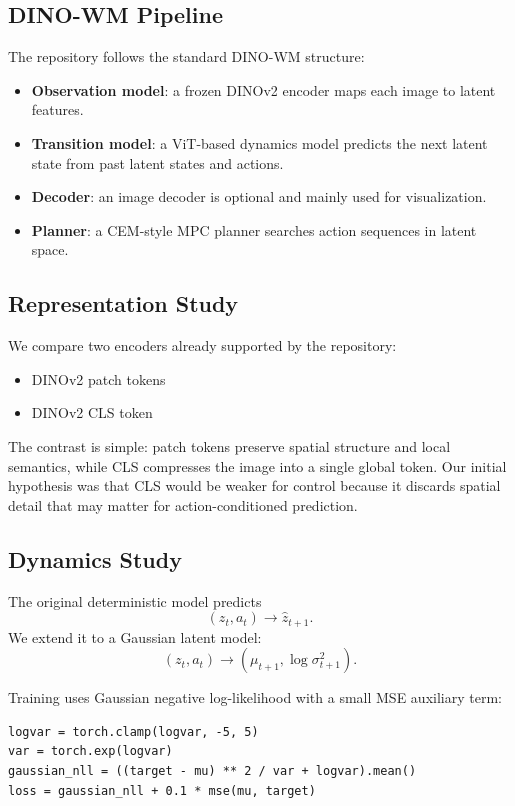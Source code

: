 \documentclass[11pt]{article}
\begin{document}
\subsection{DINO-WM Pipeline}
The repository follows the standard DINO-WM structure:
\begin{itemize}
\item \textbf{Observation model}: a frozen DINOv2 encoder maps each image to latent features.
\item \textbf{Transition model}: a ViT-based dynamics model predicts the next latent state from past latent states and actions.
\item \textbf{Decoder}: an image decoder is optional and mainly used for visualization.
\item \textbf{Planner}: a CEM-style MPC planner searches action sequences in latent space.
\end{itemize}

\subsection{Representation Study}
We compare two encoders already supported by the repository:
\begin{itemize}
\item DINOv2 patch tokens \citep{oquab2023dinov2}
\item DINOv2 CLS token \citep{caron2021emerging}
\end{itemize}

The contrast is simple: patch tokens preserve spatial structure and local semantics, while CLS compresses the image into a single global token. Our initial hypothesis was that CLS would be weaker for control because it discards spatial detail that may matter for action-conditioned prediction.

\subsection{Dynamics Study}
The original deterministic model predicts
\[
(z_t, a_t) \rightarrow \hat z_{t+1}.
\]
We extend it to a Gaussian latent model:
\[
(z_t, a_t) \rightarrow (\mu_{t+1}, \log \sigma^2_{t+1}).
\]

Training uses Gaussian negative log-likelihood with a small MSE auxiliary term:
\begin{verbatim}
logvar = torch.clamp(logvar, -5, 5)
var = torch.exp(logvar)
gaussian_nll = ((target - mu) ** 2 / var + logvar).mean()
loss = gaussian_nll + 0.1 * mse(mu, target)
\end{verbatim}
\end{document}
